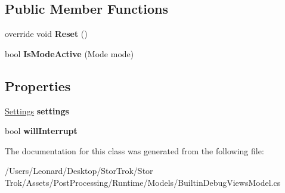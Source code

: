 \subsection*{Public Member Functions}
\begin{DoxyCompactItemize}
\item 
\mbox{\label{class_unity_engine_1_1_post_processing_1_1_builtin_debug_views_model_ad9e1b645a461131af7abfc318a45d9b0}} 
override void {\bfseries Reset} ()
\item 
\mbox{\label{class_unity_engine_1_1_post_processing_1_1_builtin_debug_views_model_a3c07a09b1bb7cfe08523d945fc982f1d}} 
bool {\bfseries Is\+Mode\+Active} (Mode mode)
\end{DoxyCompactItemize}
\subsection*{Properties}
\begin{DoxyCompactItemize}
\item 
\mbox{\label{class_unity_engine_1_1_post_processing_1_1_builtin_debug_views_model_acf518ba511401f5769463ceef698999a}} 
\hyperlink{struct_unity_engine_1_1_post_processing_1_1_builtin_debug_views_model_1_1_settings}{Settings} {\bfseries settings}
\item 
\mbox{\label{class_unity_engine_1_1_post_processing_1_1_builtin_debug_views_model_a0df7ee63e0c3191da3075438efb41636}} 
bool {\bfseries will\+Interrupt}
\end{DoxyCompactItemize}


The documentation for this class was generated from the following file\+:\begin{DoxyCompactItemize}
\item 
/\+Users/\+Leonard/\+Desktop/\+Stor\+Trok/\+Stor Trok/\+Assets/\+Post\+Processing/\+Runtime/\+Models/Builtin\+Debug\+Views\+Model.\+cs\end{DoxyCompactItemize}
